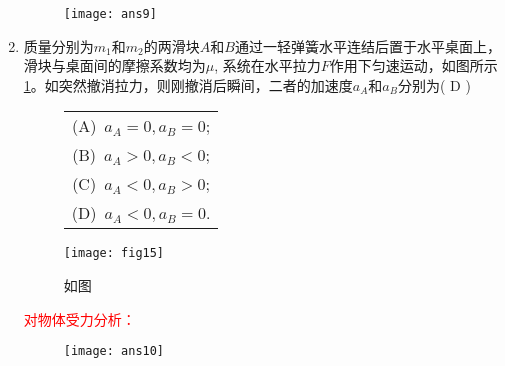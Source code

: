 \begin{enumerate}
\begin{note}
\begin{figure}[H]
            \centering
            \texttt{[image: ans9]}
        \end{figure}
    \end{note}
    \item 质量分别为$m_1$和$m_2$的两滑块$A$和$B$通过一轻弹簧水平连结后置于水平桌面上，滑块与桌面间的摩擦系数均为$\mu$, 系统在水平拉力$F$作用下匀速运动，如图所示\ref{Fig:15}。如突然撤消拉力，则刚撤消后瞬间，二者的加速度$a_A$和$a_B$分别为( D ) 
    \begin{figure}[ht]
        \begin{minipage}[ht]{0.4\linewidth}
           \begin{table}[H]
               \begin{tabular}{c}
                  \qquad   (A)\ $a_A=0, a_B=0$;\\
                  \qquad  (B)\ $a_A>0, a_B<0$;\\
                  \qquad  (C)\ $a_A<0, a_B>0$;\\
                  \qquad  (D)\ $a_A<0, a_B=0$.
               \end{tabular}
           \end{table}
        \end{minipage}
        \begin{minipage}[h]{0.5\linewidth}
            \texttt{[image: fig15]}
            \caption{如图}\label{Fig:15}
        \end{minipage}
    \end{figure}
    \begin{note}
        \textcolor{red}{对物体受力分析： }
        \begin{figure}[H]
            \centering
            \texttt{[image: ans10]}
        \end{figure}
    \end{note}
\end{enumerate}
